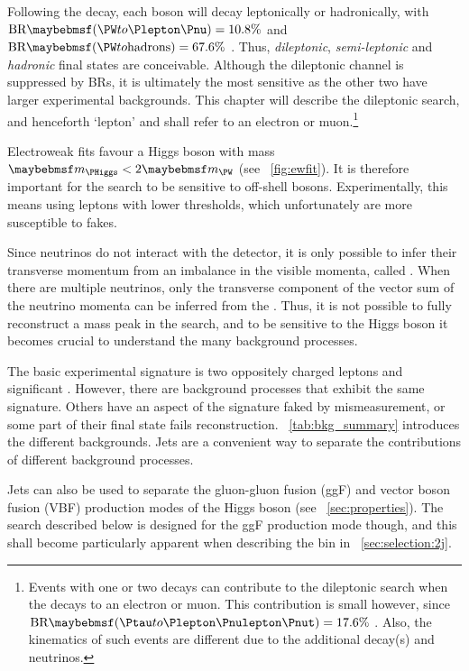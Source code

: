 
Following the \HWW decay, each \PW boson will decay leptonically or hadronically, with 
$\text{BR}\parenths{\HepProcess{\PW\HepTo\Plepton\Pnu}} = 10.8\%$ and 
$\text{BR}\parenths{\HepProcess{\PW\HepTo \text{hadrons}}} = 67.6\%$ \cite{PDG:2012}. 
Thus, \textit{dileptonic}, \textit{semi-leptonic} and \textit{hadronic} final states are 
conceivable. Although the dileptonic channel is suppressed by BRs, it is ultimately 
the most sensitive as the other two have larger experimental backgrounds. This chapter 
will describe the dileptonic search, and henceforth 
`lepton' and \Plepton shall refer to an electron or muon.\footnote{
	Events with one or two \HepProcess{\PW\HepTo\Ptau\Pnu} decays can 
	contribute to the dileptonic search when the \Ptau decays to an electron or muon. This 
	contribution is small however, since
	$\text{BR}\parenths{\HepProcess{\Ptau\HepTo\Plepton\Pnulepton\Pnut}} = 17.6\%$ 
	\cite{PDG:2012}. Also, the kinematics of such events are different due to the 
	additional decay(s) and neutrinos.
}

Electroweak fits favour a Higgs boson with mass $\mH < 2\mW$ (see \Figure~\ref{fig:ewfit}).
It is therefore important for the \HWW search to be sensitive to off-shell \PW bosons. 
Experimentally, this means using leptons with lower \pt thresholds, which unfortunately 
are more susceptible to fakes.

Since neutrinos do not interact with the detector, it is only possible to infer their 
transverse momentum from an imbalance in the visible momenta, called \met. When there are 
multiple neutrinos, only the transverse component of the vector sum of the neutrino 
momenta can be inferred from the \met. Thus, it is not possible to fully reconstruct a 
mass peak in the \HWWlvlv search, and to be sensitive to the Higgs boson it becomes 
crucial to understand the many background processes.

The basic experimental signature is two oppositely charged leptons and significant \met. 
However, there are background processes that exhibit the same signature. Others have an 
aspect of the signature faked by mismeasurement, or some part of their final state fails 
reconstruction. \Table~\ref{tab:bkg_summary} introduces the different backgrounds. Jets 
are a convenient way to separate the contributions of different background processes.

Jets can also be used to separate the gluon-gluon fusion (ggF) and vector boson fusion 
(VBF) production modes of the Higgs boson (see \Section~\ref{sec:properties}). The search 
described below is designed for the ggF production mode though, and this shall become 
particularly apparent when describing the \twojet bin in \Section~\ref{sec:selection:2j}.

